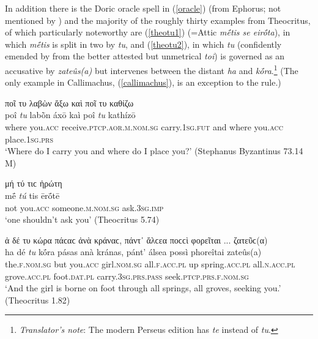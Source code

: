 In addition there is the Doric oracle spell in (\ref{oracle}) (from Ephorus; not mentioned by \citealp[255]{Ahrens1843}) and the majority of the roughly thirty examples from Theocritus, of which particularly noteworthy are (\ref{theotu1}) (=Attic \emph{mḗtis se eirṓta}), in which \emph{mḗtis} is split in two by \emph{tu}, and (\ref{theotu2}), in which \emph{tu} (confidently emended by \citet[290]{Brunck1776} from the better attested but unmetrical \textit{toi}) is governed as an accusative by \textit{zateûs(a)} but intervenes between the distant \textit{ha} and \textit{kṓra}.\footnote{\emph{Translator's note}: The modern Perseus edition has \textit{te} instead of \textit{tu}.} (The only example in Callimachus, (\ref{callimachus}), is an exception to the rule.)

\begin{exe}
\ex ποῖ {τυ} λαβὼν ἄξω καὶ ποῖ {τυ} καθίζω\\
\gll poî \emph{tu} labṑn áxō kaì poî \emph{tu} kathízō\\
where you.\textsc{acc} receive.\textsc{ptcp.aor.m.nom.sg} carry.\textsc{1sg.fut} and where you.\textsc{acc} place.\textsc{1sg.prs}\\
\trans `Where do I carry you and where do I place you?' (Stephanus Byzantinus 73.14 M)
\label{oracle}
\end{exe}

\begin{exe}
\ex μή {τύ} τιϲ ἠρώτη\\
\gll mḗ \emph{tú} tis ērṓtē\\
not you.\textsc{acc} someone.\textsc{m.nom.sg} ask.\textsc{3sg.imp}\\
\trans `one shouldn't ask you' (Theocritus 5.74)
\label{theotu1}
\end{exe}

\begin{exe}
\ex ἁ δέ {τυ} κώρα πάϲαϲ ἀνὰ κράναϲ, πάντ᾽ ἄλϲεα ποϲϲὶ φορεῖται ... ζατεῦϲ(α)\\
\gll ha dé \emph{tu} kṓra pásas anà kránas, pánt' álsea possì phoreîtai zateûs(a)\\
the.\textsc{f.nom.sg} but you.\textsc{acc} girl.\textsc{nom.sg} all.\textsc{f.acc.pl} up spring.\textsc{acc.pl} all.\textsc{n.acc.pl} grove.\textsc{acc.pl} foot.\textsc{dat.pl} carry.\textsc{3sg.prs.pass} seek.\textsc{ptcp.prs.f.nom.sg}\\
\trans `And the girl is borne on foot through all springs, all groves, seeking you.' (Theocritus 1.82)
\label{theotu2}
\end{exe}

